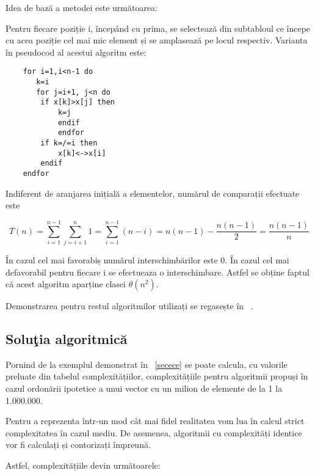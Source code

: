 \documentclass[12pt]{article}
\begin{document}
Idea de bază a metodei este următoarea:

Pentru fiecare poziție i, începând cu prima, se selectează din subtabloul ce începe cu acea poziție cel mai mic element și se amplasează pe locul respectiv.
Varianta în pseudocod al acestui algoritm este:

\begin{lstlisting}
    for i=1,i<n-1 do
       k=i
       for j=i+1, j<n do
        if x[k]>x[j] then
            k=j
            endif
            endfor
        if k=/=i then
            x[k]<->x[i]
        endif
    endfor
\end{lstlisting}
 Indiferent de aranjarea inițială a elementelor, numărul de comparații efectuate este

\[ T(n)=\sum_{i=1}^{n-1} \sum_{j=i+1}^{n} 1= \sum_{i=1}^{n-1}(n-i)=n(n-1)-\frac{n(n-1)}{2}=\frac{n(n-1)}{n} \]

În cazul cel mai favorabiș numărul interschimbărilor este 0. În cazul cel mai defavorabil pentru fiecare i se efectueaza o interschimbare. Astfel se obține faptul că acest algoritm aparține clasei $\theta(n^2)$.

Demonstrarea pentru restul algoritmilor utilizați se regasește în ~\cite{ZAHARIE2008}.

\subsection{Soluţia algoritmică}

Pornind de la exemplul demonstrat în ~\ref{secece} se poate calcula, cu valorile preluate din tabelul complexitățiilor, complexitățiile pentru algoritmii propuși în cazul ordonării ipotetice a unui vector cu un milion de elemente de la 1 la 1.000.000.

Pentru a reprezenta într-un mod cât mai fidel realitatea vom lua în calcul strict complexitatea în cazul mediu. De asemenea, algoritmii cu complexități identice vor fi calculați și contorizați împreună.

Astfel, complexitățiile devin următoarele:
\end{document}
